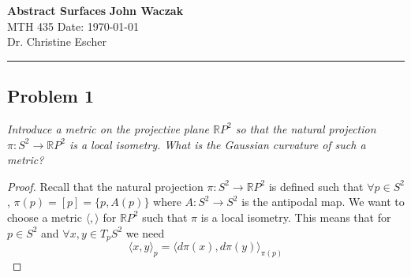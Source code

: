 \documentclass[a4paper, 11pt]{article}
\begin{document}
\noindent
\large\textbf{Abstract Surfaces} \hfill \textbf{John Waczak} \\
\normalsize MTH 435 \hfill  Date: \today \\
Dr. Christine Escher \\
\par\noindent\rule{\textwidth}{0.4pt}	
	
\subsection*{Problem 1}
	\textit{Introduce a metric on the projective plane $\mathbb{R}P^2$ so that the natural projection $\pi:S^2\to\mathbb{R}P^2$ is a local isometry. What is the Gaussian curvature of such a metric?}

	\begin{proof}
		Recall that the natural projection $\pi:S^2\to\mathbb{R}P^2$ is defined such that $\forall p \in S^2$, $\pi(p) = [p] = \{p, A(p)\}$ where $A:S^2\to S^2$ is the antipodal map. We want to choose a metric $\langle , \rangle$ for $\mathbb{R}P^2$ such that $\pi$ is a local isometry. This means that for $p\in S^2$ and $\forall x,y \in T_p S^2$ we need 	
			\begin{equation*}
				\big\langle x,y \big\rangle_p = \big\langle d\pi(x), d\pi(y) \big\rangle_{\pi(p)}
			\end{equation*}
		

\end{proof}
\end{document}
